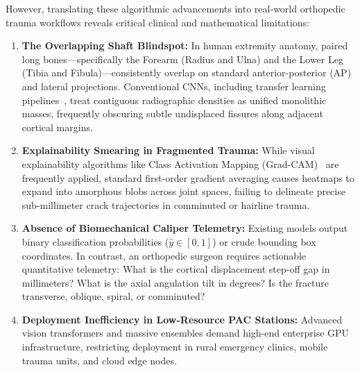 \documentclass[journal]{IEEEtran}
\begin{document}
However, translating these algorithmic advancements into real-world orthopedic trauma workflows reveals critical clinical and mathematical limitations:
\begin{enumerate}
    \item \textbf{The Overlapping Shaft Blindspot:} In human extremity anatomy, paired long bones---specifically the Forearm (Radius and Ulna) and the Lower Leg (Tibia and Fibula)---consistently overlap on standard anterior-posterior (AP) and lateral projections. Conventional CNNs, including transfer learning pipelines~\cite{noveltransfer2025}, treat contiguous radiographic densities as unified monolithic masses, frequently obscuring subtle undisplaced fissures along adjacent cortical margins.
    \item \textbf{Explainability Smearing in Fragmented Trauma:} While visual explainability algorithms like Class Activation Mapping (Grad-CAM)~\cite{selvaraju2017grad} are frequently applied, standard first-order gradient averaging causes heatmaps to expand into amorphous blobs across joint spaces, failing to delineate precise sub-millimeter crack trajectories in comminuted or hairline trauma.
    \item \textbf{Absence of Biomechanical Caliper Telemetry:} Existing models output binary classification probabilities ($\hat{y} \in [0, 1]$) or crude bounding box coordinates. In contrast, an orthopedic surgeon requires actionable quantitative telemetry: What is the cortical displacement step-off gap in millimeters? What is the axial angulation tilt in degrees? Is the fracture transverse, oblique, spiral, or comminuted?
    \item \textbf{Deployment Inefficiency in Low-Resource PAC Stations:} Advanced vision transformers and massive ensembles demand high-end enterprise GPU infrastructure, restricting deployment in rural emergency clinics, mobile trauma units, and cloud edge nodes.
\end{enumerate}
\end{document}
